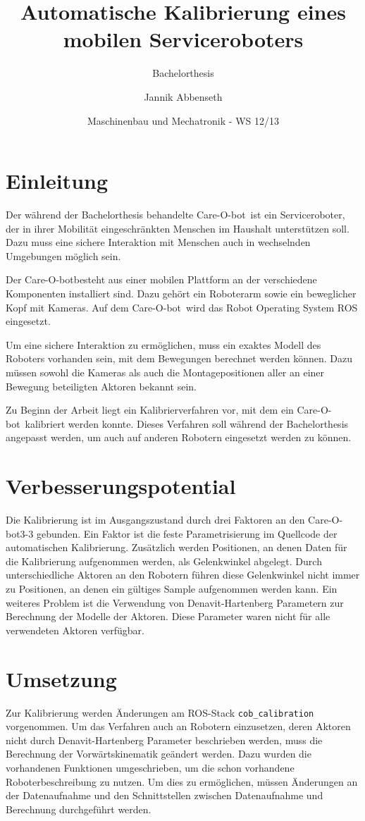 \documentclass{scrartcl}
\title{Automatische Kalibrierung eines mobilen Serviceroboters}
\subtitle{Bachelorthesis}
\author{Jannik Abbenseth}
\date{Maschinenbau und Mechatronik - WS 12/13}
\newcommand{\cob}{Care-O-bot}
\begin{document}
 
\maketitle
\section{Einleitung}

Der während der Bachelorthesis behandelte \cob\ ist ein Serviceroboter, der
in ihrer Mobilität eingeschränkten Menschen im Haushalt unterstützen soll. 
Dazu muss eine sichere Interaktion mit Menschen auch in wechselnden Umgebungen
möglich sein.

Der \cob besteht aus einer mobilen Plattform an der verschiedene Komponenten 
installiert sind. Dazu gehört ein Roboterarm sowie ein beweglicher Kopf mit 
Kameras. Auf dem \cob\ wird das Robot Operating System ROS eingesetzt. 

Um eine sichere Interaktion zu ermöglichen, muss ein exaktes Modell des 
Roboters vorhanden sein, mit dem Bewegungen berechnet werden können.
Dazu müssen sowohl die Kameras als auch die Montagepositionen aller an einer
Bewegung beteiligten Aktoren bekannt sein.

Zu Beginn der Arbeit liegt ein Kalibrierverfahren vor, mit dem ein \cob\ 
kalibriert werden konnte. Dieses Verfahren soll während der Bachelorthesis
angepasst werden, um auch auf anderen Robotern eingesetzt werden zu können.


\section{Verbesserungspotential}
\label{sec:Verbesserungspotential}

Die Kalibrierung ist im Ausgangszustand durch drei Faktoren an den \cob3-3 
gebunden. Ein Faktor ist die feste Parametrisierung im Quellcode der
automatischen Kalibrierung. Zusätzlich werden Positionen, an denen Daten für 
die Kalibrierung aufgenommen werden, als Gelenkwinkel abgelegt. Durch 
unterschiedliche Aktoren an den Robotern führen diese Gelenkwinkel nicht immer
zu Positionen, an denen ein gültiges Sample aufgenommen werden kann. Ein weiteres
Problem ist die Verwendung von Denavit-Hartenberg Parametern zur Berechnung der
Modelle der Aktoren. Diese Parameter waren nicht für alle verwendeten Aktoren
verfügbar.

\section{Umsetzung}
Zur Kalibrierung werden Änderungen am ROS-Stack \texttt{cob\_calibration}
vorgenommen. Um das Verfahren auch an Robotern einzusetzen, deren Aktoren nicht 
durch Denavit-Hartenberg Parameter beschrieben werden, muss die Berechnung der
Vorwärtskinematik geändert werden. Dazu wurden die vorhandenen Funktionen 
umgeschrieben, um die schon vorhandene Roboterbeschreibung zu nutzen. Um dies
zu ermöglichen, müssen Änderungen an der Datenaufnahme und den Schnittstellen
zwischen Datenaufnahme und Berechnung durchgeführt werden.
\end{document}
